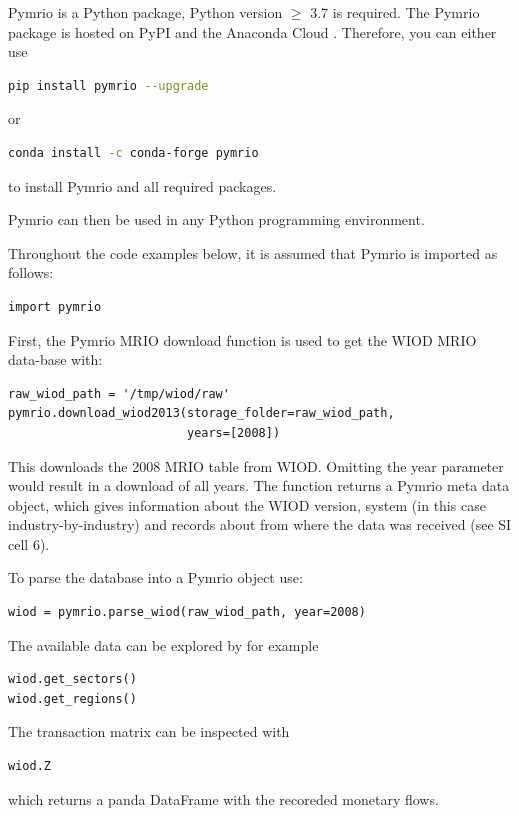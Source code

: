 \documentclass{jors}
\begin{document}
Pymrio is a Python \cite{python2018_Official} package, Python version  $\geq$ 3.7 is required.
The Pymrio package is hosted on PyPI  \cite{pypi2018_PyPI}  and the Anaconda Cloud \cite{anacondainc.2018_Anaconda}.
Therefore, you can either use
\begin{lstlisting}[language=Bash]
pip install pymrio --upgrade
\end{lstlisting}
or
\begin{lstlisting}[language=Bash]
conda install -c conda-forge pymrio 
\end{lstlisting}

to install Pymrio and all required packages.

Pymrio can then be used in any Python programming environment.

Throughout the code examples below, it is assumed that Pymrio is imported as follows: 

\begin{lstlisting}
import pymrio
\end{lstlisting}

First, the Pymrio MRIO download function is used to get the WIOD MRIO data-base with:
\begin{lstlisting}
raw_wiod_path = '/tmp/wiod/raw'
pymrio.download_wiod2013(storage_folder=raw_wiod_path,
                         years=[2008])
\end{lstlisting}

This downloads the 2008 MRIO table from WIOD. Omitting the year parameter would result in a download of all years.
The function returns a Pymrio meta data object, which gives information about the WIOD version, system (in this case industry-by-industry) and records about from where the data was received (see SI cell 6).

To parse the database into a Pymrio object use:
\begin{lstlisting}
wiod = pymrio.parse_wiod(raw_wiod_path, year=2008)
\end{lstlisting}

The available data can be explored by for example
\begin{lstlisting}
wiod.get_sectors()
wiod.get_regions()
\end{lstlisting}

The transaction matrix can be inspected with
\begin{lstlisting}
wiod.Z
\end{lstlisting}

which returns a panda DataFrame with the recoreded monetary flows.
\end{document}

